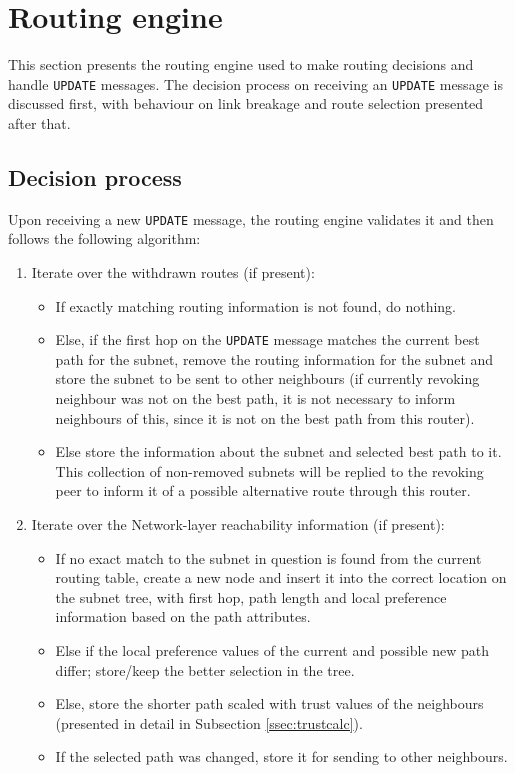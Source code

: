 \documentclass[11pt,a4paper,titlepage]{report}
\begin{document}
\section{Routing engine}\label{sec:routing}
This section presents the routing engine used to make routing decisions and handle \texttt{UPDATE} messages. The decision process on receiving an \texttt{UPDATE} message is discussed first, with behaviour on link breakage and route selection presented after that.

\subsection{Decision process}\label{ssec:decision}
Upon receiving a new \texttt{UPDATE} message, the routing engine validates it and then follows the following algorithm:
\begin{enumerate}
\item Iterate over the withdrawn routes (if present):
	\begin{itemize}
	\item If exactly matching routing information is not found, do nothing.
	\item Else, if the first hop on the \texttt{UPDATE} message matches the current best path for the subnet, remove the routing information for the subnet and store the subnet to be sent to other neighbours (if currently revoking neighbour was not on the best path, it is not necessary to inform neighbours of this, since it is not on the best path from this router).
	\item Else store the information about the subnet and selected best path to it. This collection of non-removed subnets will be replied to the revoking peer to inform it of a possible alternative route through this router.
	\end{itemize}

\item Iterate over the Network-layer reachability information (if present):
	\begin{itemize}
	\item If no exact match to the subnet in question is found from the current routing table, create a new node and insert it into the correct location on the subnet tree, with first hop, path length and local preference information based on the path attributes.
	\item Else if the local preference values of the current and possible new path differ; store/keep the better selection in the tree.
	\item Else, store the shorter path scaled with trust values of the neighbours (presented in detail in Subsection \ref{ssec:trustcalc}).
	\item If the selected path was changed, store it for sending to other neighbours.
	\end{itemize}
	

\end{enumerate}
\end{document}
